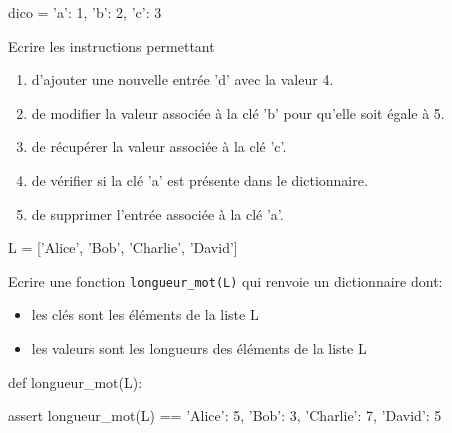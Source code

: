 \documentclass[11pt, a4paper]{report}
\begin{document}
\begin{exercice_cours}{}
    
    \begin{CodePythontexAlt}[TaillePolice=\normalsize, Largeur=1\linewidth,Centre,PremLigne=1, Lignes=false,]{}
dico = {'a': 1, 'b': 2, 'c': 3}
\end{CodePythontexAlt}

Ecrire les instructions permettant
    \begin{enumerate}
        \item d'ajouter une nouvelle entrée 'd' avec la valeur 4. \hfill{}
        \item de modifier la valeur associée à la clé 'b' pour qu'elle soit égale à 5. \hfill{}
        \item de récupérer la valeur associée à la clé 'c'. \hfill{}
        \item de vérifier si la clé 'a' est présente dans le dictionnaire. \hfill{}
        \item de supprimer l'entrée associée à la clé 'a'. \hfill{}
    \end{enumerate}

\end{exercice_cours}

\begin{exercice_cours}{}
    
\begin{CodePythontexAlt}[TaillePolice=\normalsize, Largeur=1\linewidth,Centre,Lignes=false,PremLigne=1]{}
L = ['Alice', 'Bob', 'Charlie', 'David']
\end{CodePythontexAlt}

Ecrire une fonction \verb|longueur_mot(L)| qui renvoie un dictionnaire dont:
\begin{itemize}
    \item les clés sont les éléments de la liste L
    \item les valeurs sont les longueurs des éléments de la liste L
\end{itemize}


	\begin{CodePythontexAlt}[TaillePolice=\normalsize, Largeur=1\linewidth,Centre,PremLigne=1, Lignes=false,]{}
    def longueur_mot(L):
        
    





    assert longueur_mot(L) == {'Alice': 5, 'Bob': 3, 'Charlie': 7, 'David': 5}
        \end{CodePythontexAlt}


       
\end{exercice_cours}
\end{document}
